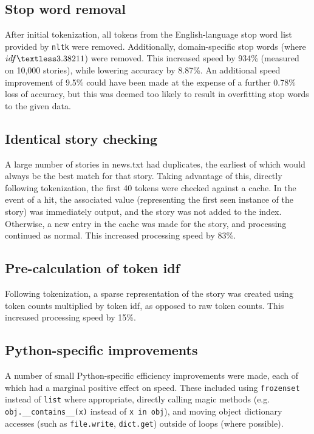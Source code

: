 \documentclass{article}
\begin{document}
\subsection{Stop word removal}
After initial tokenization, all tokens from the English-language stop word list provided by \texttt{nltk} were removed. Additionally, domain-specific stop words (where $idf \textless 3.38211$) were removed. This increased speed by 934\% (measured on 10,000 stories), while lowering accuracy by 8.87\%. An additional speed improvement of 9.5\% could have been made at the expense of a further 0.78\% loss of accuracy, but this was deemed too likely to result in overfitting stop words to the given data.
\subsection{Identical story checking}
A large number of stories in news.txt had duplicates, the earliest of which would always be the best match for that story. Taking advantage of this, directly following tokenization, the first 40 tokens were checked against a cache. In the event of a hit, the associated value (representing the first seen instance of the story) was immediately output, and the story was not added to the index. Otherwise, a new entry in the cache was made for the story, and processing continued as normal. This increased processing speed by 83\%.
\subsection{Pre-calculation of token idf}
Following tokenization, a sparse representation of the story was created using token counts multiplied by token idf, as opposed to raw token counts. This increased processing speed by 15\%.
\subsection{Python-specific improvements}
A number of small Python-specific efficiency improvements were made, each of which had a marginal positive effect on speed. These included using \texttt{frozenset} instead of \texttt{list} where appropriate, directly calling magic methods (e.g. \texttt{obj.\_\_contains\_\_(x)} instead of \texttt{x in obj}), and moving object dictionary accesses (such as \texttt{file.write}, \texttt{dict.get}) outside of loops (where possible).
\end{document}
